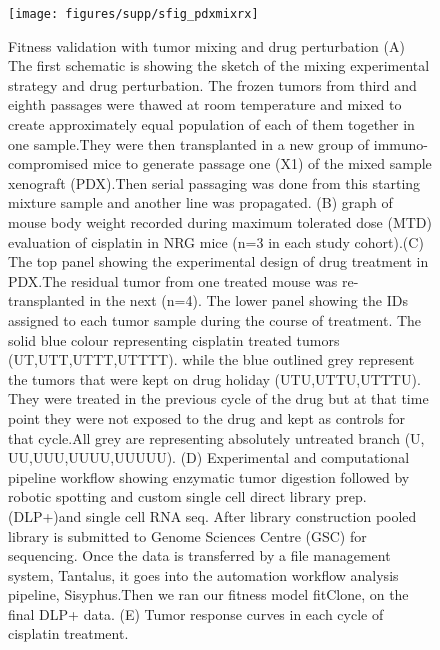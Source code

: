 \begin{figure}
\centering
\texttt{[image: figures/supp/sfig\_pdxmixrx]}
\caption{Fitness validation with tumor mixing and drug perturbation (A)	The first schematic is showing the sketch of the mixing experimental strategy and drug perturbation. The frozen tumors from third and eighth passages were thawed at room temperature and mixed to create approximately equal population of each of them together in one sample.They were then transplanted in a new group of immuno-compromised mice to generate passage one (X1) of the mixed sample xenograft (PDX).Then serial passaging was done from this starting mixture sample and another line was propagated. (B) graph of mouse body weight recorded during maximum tolerated dose (MTD) evaluation of cisplatin in NRG mice (n=3 in each study cohort).(C) The top panel showing the experimental design of drug treatment in PDX.The residual tumor from one treated mouse was re-transplanted in the next (n=4). The lower panel showing the IDs assigned to each tumor sample during the course of treatment. The solid blue colour representing cisplatin treated tumors (UT,UTT,UTTT,UTTTT). while the blue outlined grey represent the tumors that were kept on drug holiday (UTU,UTTU,UTTTU). They were treated in the previous cycle of the drug but at that time point they were not exposed to the drug and kept as controls for that cycle.All grey are representing absolutely untreated branch (U, UU,UUU,UUUU,UUUUU). (D) Experimental and computational pipeline workflow showing enzymatic tumor digestion followed by robotic spotting and custom single cell direct library prep. (DLP+)and single cell RNA seq. After library construction pooled library is submitted to Genome Sciences Centre (GSC) for sequencing. Once the data is transferred by a file management system, Tantalus, it goes into the automation workflow analysis pipeline, Sisyphus.Then we ran our fitness model fitClone, on the final DLP+ data. (E) Tumor response curves in each cycle of cisplatin treatment.}
\label{sfig:pdxmixrx}
\end{figure}



\begin{figure}
\centering
\label{sfig:pdxmixrx}
\end{figure}
